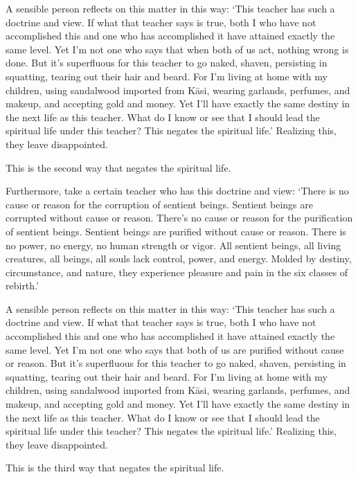 \documentclass[12pt,openany]{book}%
\begin{document}
A sensible person reflects on this matter in this way: ‘This teacher has such a doctrine and view. If what that teacher says is true, both I who have not accomplished this and one who has accomplished it have attained exactly the same level. Yet I’m not one who says that when both of us act, nothing wrong is done. But it’s superfluous for this teacher to go naked, shaven, persisting in squatting, tearing out their hair and beard. For I’m living at home with my children, using sandalwood imported from \textsanskrit{Kāsi}, wearing garlands, perfumes, and makeup, and accepting gold and money. Yet I’ll have exactly the same destiny in the next life as this teacher. What do I know or see that I should lead the spiritual life under this teacher? This negates the spiritual life.’ Realizing this, they leave disappointed. 

This is the second way that negates the spiritual life. 

Furthermore, take a certain teacher who has this doctrine and view: ‘There is no cause or reason for the corruption of sentient beings. Sentient beings are corrupted without cause or reason. There’s no cause or reason for the purification of sentient beings. Sentient beings are purified without cause or reason. There is no power, no energy, no human strength or vigor. All sentient beings, all living creatures, all beings, all souls lack control, power, and energy. Molded by destiny, circumstance, and nature, they experience pleasure and pain in the six classes of rebirth.’ 

A sensible person reflects on this matter in this way: ‘This teacher has such a doctrine and view. If what that teacher says is true, both I who have not accomplished this and one who has accomplished it have attained exactly the same level. Yet I’m not one who says that both of us are purified without cause or reason. But it’s superfluous for this teacher to go naked, shaven, persisting in squatting, tearing out their hair and beard. For I’m living at home with my children, using sandalwood imported from \textsanskrit{Kāsi}, wearing garlands, perfumes, and makeup, and accepting gold and money. Yet I’ll have exactly the same destiny in the next life as this teacher. What do I know or see that I should lead the spiritual life under this teacher? This negates the spiritual life.’ Realizing this, they leave disappointed. 

This is the third way that negates the spiritual life. 
\end{document}
